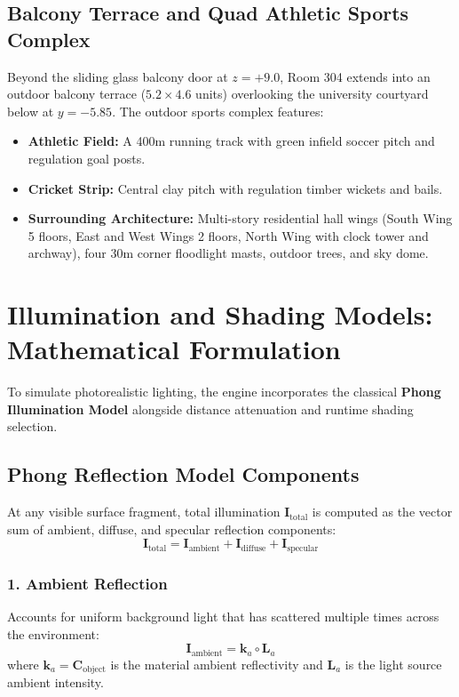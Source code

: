 \documentclass[11pt,a4paper]{article}
\begin{document}
\subsection{Balcony Terrace and Quad Athletic Sports Complex}
Beyond the sliding glass balcony door at $z = +9.0$, Room 304 extends into an outdoor balcony terrace ($5.2 \times 4.6$ units) overlooking the university courtyard below at $y = -5.85$. The outdoor sports complex features:
\begin{itemize}[leftmargin=1.2em, itemsep=0.5pt, topsep=0.5pt]
    \item \textbf{Athletic Field:} A 400m running track with green infield soccer pitch and regulation goal posts.
    \item \textbf{Cricket Strip:} Central clay pitch with regulation timber wickets and bails.
    \item \textbf{Surrounding Architecture:} Multi-story residential hall wings (South Wing 5 floors, East and West Wings 2 floors, North Wing with clock tower and archway), four 30m corner floodlight masts, outdoor trees, and sky dome.
\end{itemize}




\section{Illumination and Shading Models: Mathematical Formulation}

To simulate photorealistic lighting, the engine incorporates the classical \textbf{Phong Illumination Model} alongside distance attenuation and runtime shading selection.

\subsection{Phong Reflection Model Components}
At any visible surface fragment, total illumination $\mathbf{I}_{\text{total}}$ is computed as the vector sum of ambient, diffuse, and specular reflection components:
\begin{equation}
    \mathbf{I}_{\text{total}} = \mathbf{I}_{\text{ambient}} + \mathbf{I}_{\text{diffuse}} + \mathbf{I}_{\text{specular}}
\end{equation}

\subsubsection{1. Ambient Reflection}
Accounts for uniform background light that has scattered multiple times across the environment:
\begin{equation}
    \mathbf{I}_{\text{ambient}} = \mathbf{k}_a \circ \mathbf{L}_a
\end{equation}
where $\mathbf{k}_a = \mathbf{C}_{\text{object}}$ is the material ambient reflectivity and $\mathbf{L}_a$ is the light source ambient intensity.
\end{document}

